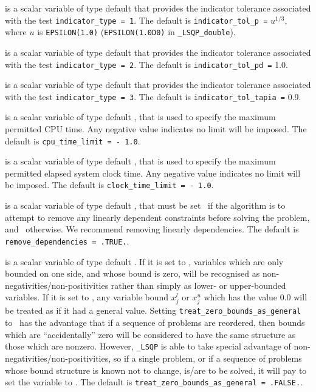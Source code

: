 \documentclass{galahad}
\newcommand{\packagename}{LSQP}
\newcommand{\fullpackagename}{\libraryname\_\-\packagename}
\begin{document}
\begin{description}
is a scalar variable of type default \realdp that
provides the indicator tolerance associated with the test
{\tt indicator\_type = 1}.
The default is {\tt indicator\_tol\_p =} $u^{1/3}$,
where $u$ is {\tt EPSILON(1.0)} ({\tt EPSILON(1.0D0)} in 
{\tt \fullpackagename\_double}).

is a scalar variable of type default \realdp that
provides the indicator tolerance associated with the test
{\tt indicator\_type = 2}.
The default is {\tt indicator\_tol\_pd =} 1.0.

is a scalar variable of type default \realdp that
provides the indicator tolerance associated with the test
{\tt indicator\_type = 3}.
The default is {\tt indicator\_tol\-\_tapia =} 0.9.

 is a scalar variable of type default \realdp, 
that is used to specify the maximum permitted CPU time. Any negative
value indicates no limit will be imposed. The default is 
{\tt cpu\_time\_limit = - 1.0}.

 is a scalar variable of type default \realdp, 
that is used to specify the maximum permitted elapsed system clock time. 
Any negative value indicates no limit will be imposed. The default is 
{\tt clock\_time\_limit = - 1.0}.

 is a scalar variable of type 
default \logical, that must be set \true\ if the algorithm
is to attempt to remove any linearly dependent constraints before
solving the problem, and \false\ otherwise. 
We recommend removing linearly dependencies.
The default is {\tt remove\_dependencies = .TRUE.}.

 is a scalar variable of type 
default \logical.
If it is set to \false, variables which 
are only bounded on one side, and whose bound is zero,
will be recognised as non-negativities/non-positivities rather than simply as
lower- or upper-bounded variables.
If it is set to \true, any variable bound 
$x_{j}^{l}$ or $x_{j}^{u}$ which has the value 0.0 will be
treated as if it had a general value.
Setting {\tt treat\_zero\_bounds\_as\_general} to \true\ has the advantage
that if a sequence of problems are reordered, then bounds which are
``accidentally'' zero will be considered to have the same structure as
those which are nonzero. However, {\tt \fullpackagename} is
able to take special advantage of non-negativities/non-positivities, so
if a single problem, or if a sequence of problems whose 
bound structure is known not to change, is/are to be solved, 
it will pay to set the variable to \false.
The default is {\tt treat\_zero\_bounds\_as\_general = .FALSE.}.


\end{description}
\end{document}
